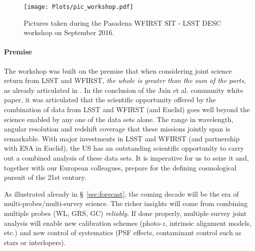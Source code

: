 \begin{figure}
\texttt{[image: Plots/pic\_workshop.pdf]}
\caption{\label{fig:pic_workshop}Pictures taken during the Pasadena WFIRST SIT - LSST DESC workshop on September 2016.}
\end{figure}

\paragraph*{Premise} The workshop was built on the premise that when considering
joint science return from LSST and WFIRST, \emph{the whole is greater than the
sum of the parts}, as already articulated in \citet{Jain:2015cpa}. In the
conclusion of the Jain et al. community white paper, it was articulated that the
scientific opportunity offered by the combination of data from LSST and WFIRST
(and Euclid) goes well beyond the science enabled by any one of the data sets
alone. The range in wavelength, angular resolution and redshift coverage that
these missions jointly span is remarkable. With major investments in LSST and
WFIRST (and partnership with ESA in Euclid), the US has an outstanding
scientific opportunity to carry out a combined analysis of these data sets. It
is imperative for us to seize it and, together with our European colleagues,
prepare for the defining cosmological pursuit of the 21st century.

As illustrated already in \S~\ref{sec:forecast}, the coming decade will be the
era of multi-probes/multi-survey science. The richer insights will come from
combining multiple probes (WL, GRS, GC) \emph{reliably}. If done properly,
multiple survey joint analysis will enable new calibration schemes (photo-$z$,
intrinsic alignment models, etc.) and new control of systematics (PSF effects,
contaminant control such as stars or interlopers).


